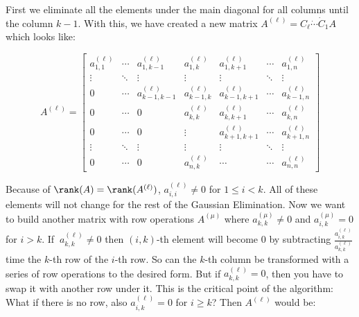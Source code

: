 First we eliminate all the elements under the main diagonal for all columns until the column \(k - 1\).
With this, we have created a new matrix \(A^(\ell) = C_{\ell} \dot \cdots \dot C_1 A \) which looks
like:

\[
    A^{(\ell)} =
    \begin{bmatrix}
        a^{(\ell)}_{1,1} & \cdots & a^{(\ell)}_{1,k-1}   & a^{(\ell)}_{1,k}    & a^{(\ell)}_{1,k+1}   & \cdots & a^{(\ell)}_{1,n}    \\
        \vdots          & \ddots & \vdots               & \vdots             & \vdots               & \ddots & \vdots             \\
        0               & \cdots & a^{(\ell)}_{k-1,k-1} & a^{(\ell)}_{k-1,k} & a^{(\ell)}_{k-1,k+1} & \cdots & a^{(\ell)}_{k-1,n} \\
        0               & \cdots & 0                    & a^{(\ell)}_{k,k}    & a^{(\ell)}_{k,k+1}   & \cdots & a^{(\ell)}_{k,n}    \\
        0               & \cdots & 0                    & \vdots             & a^{(\ell)}_{k+1,k+1} & \cdots & a^{(\ell)}_{k+1,n} \\
        \vdots          & \ddots & \vdots               & \vdots             & \vdots               & \ddots & \vdots             \\
        0               & \cdots & 0                    & a^{(\ell)}_{n,k}    & \cdots               & \cdots & a^{(\ell)}_{n,n}
    \end{bmatrix}
\]

Because of \(\rank(A) = \rank(A^{(\ell)})\), \(a^{(\ell)}_{i,i} \ne 0\) for \(1 \le i < k\). All of these
elements will not change for the rest of the Gaussian Elimination. Now we want to build another matrix
with row operations \(A^{(\mu)}\) where \(a^{(\mu)}_{k,k} \ne 0\) and \(a^{(\mu)}_{i,k} = 0\) for \(i > k\).
If \(\ a^{(\ell)}_{k,k} \ne 0\) then \((i,k)\)-th element will become 0 by subtracting
\(\frac{a^{(\ell)}_{i,k}}{a^{(\ell)}_{k,k}}\) time the \(k\)-th row of the \(i\)-th row. So can the \(k\)-th
column be transformed with a series of row operations to the desired form. But if \(a^{(\ell)}_{k,k} = 0\),
then you have to swap it with another row under it. This is the critical point of the algorithm: What
if there is no row, also \(a^{(\ell)}_{i,k} = 0\) for \(i \ge k\)? Then \(A^{(\ell)}\) would be:

